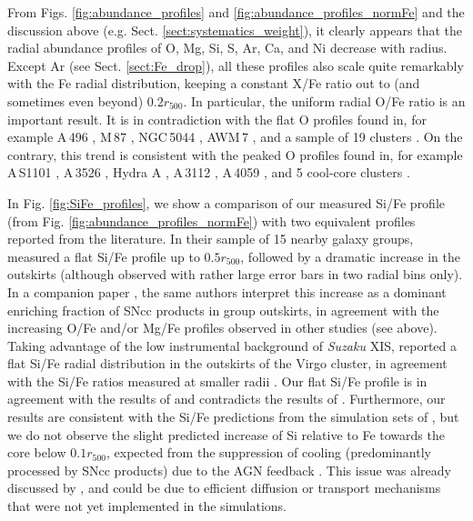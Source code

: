 \documentclass{aa}
\begin{document}
From Figs. \ref{fig:abundance_profiles} and \ref{fig:abundance_profiles_normFe} and the discussion above (e.g. Sect. \ref{sect:systematics_weight}), it clearly appears that the radial abundance profiles of O, Mg, Si, S, Ar, Ca, and Ni decrease with radius. Except Ar (see Sect. \ref{sect:Fe_drop}), all these profiles also scale quite remarkably with the Fe radial distribution, keeping a constant X/Fe ratio out to (and sometimes even beyond) $0.2 r_{500}$. In particular, the uniform radial O/Fe ratio is an important result. It is in contradiction with the flat O profiles found in, for example A\,496 \citep{2001A&A...379..107T}, M\,87 \citep{2001A&A...365L.181B,2003A&A...401..443M,2006A&A...459..353W}, NGC\,5044 \citep{2003ApJ...595..151B}, AWM\,7 \citep{2008PASJ...60S.333S}, and a sample of 19 clusters \citep{2004A&A...420..135T}. On the contrary, this trend is consistent with the peaked O profiles found in, for example A\,S1101 \citep{2006A&A...452..397D}, A\,3526 \citep{2006MNRAS.371.1483S}, Hydra A \citep{2009A&A...493..409S}, A\,3112 \citep{2012ApJ...747...32B}, A\,4059 \citep{2015A&A...575A..37M}, and 5 cool-core clusters \citet{2011A&A...528A..60L}. 


In Fig. \ref{fig:SiFe_profiles}, we show a comparison of our measured Si/Fe profile (from Fig. \ref{fig:abundance_profiles_normFe}) with two equivalent profiles reported from the literature. In their sample of 15 nearby galaxy groups, \citet[][purple triangles]{2007MNRAS.380.1554R} measured a flat Si/Fe profile up to $0.5 r_{500}$, followed by a dramatic increase in the outskirts (although observed with rather large error bars in two radial bins only). In a companion paper \citep{2009MNRAS.399..239R}, the same authors interpret this increase as a dominant enriching fraction of SNcc products in group outskirts, in agreement with the increasing O/Fe and/or Mg/Fe profiles observed in other studies (see above). Taking advantage of the low instrumental background of \textit{Suzaku} XIS, \citet[][four outermost green circles]{2015ApJ...811L..25S} reported a flat Si/Fe radial distribution in the outskirts of the Virgo cluster, in agreement with the Si/Fe ratios measured at smaller radii \citep[][two innermost green circles]{2010MNRAS.405...91S}. Our flat Si/Fe profile is in agreement with the results of \citet{2010MNRAS.405...91S,2015ApJ...811L..25S} and contradicts the results of \citet{2007MNRAS.380.1554R}. Furthermore, our results are consistent with the Si/Fe predictions from the simulation sets of \citet[][solid red line]{2014MNRAS.438..195P}, but we do not observe the slight predicted increase of Si relative to Fe towards the core below $0.1 r_{500}$, expected from the suppression of cooling (predominantly processed by SNcc products) due to the AGN feedback \citep[see also][]{2010MNRAS.401.1670F}. This issue was already discussed by \citet{2014MNRAS.438..195P}, and could be due to efficient diffusion or transport mechanisms that were not yet implemented in the simulations.
\end{document}
